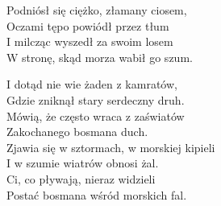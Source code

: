 Podniósł się ciężko, złamany ciosem, \\
Oczami tępo powiódł przez tłum \\
I milcząc wyszedł za swoim losem \\
W stronę, skąd morza wabił go szum. \\
\newpage

I dotąd nie wie żaden z kamratów, \\
Gdzie zniknął stary serdeczny druh. \\
Mówią, że często wraca z zaświatów \\
Zakochanego bosmana duch. \\

Zjawia się w sztormach, w morskiej kipieli \\
I w szumie wiatrów obnosi żal. \\
Ci, co pływają, nieraz widzieli \\
Postać bosmana wśród morskich fal. \\